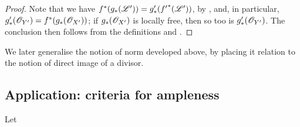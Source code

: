 \begin{proof}
Note that we have $f^*(g_*(\mathscr{L}'))=g'_*({f'}^*(\mathscr{L}'))$, by , and, in particular, $g'_*(\mathscr{O}_{Y'})=f^*(g_*(\mathscr{O}_{X'}))$;
if $g_*(\mathscr{O}_{X'})$ is locally free, then so too is $g'_*(\mathscr{O}_{Y'})$.
The conclusion then follows from the definitions and .
\end{proof}

\begin{remark}[6.5.9]
\label{II.6.5.9}
We later generalise the notion of norm developed above, by placing it relation to the notion of direct image of a divisor.
\end{remark}


\subsection{Application: criteria for ampleness}
\label{subsection:II.6.6}

\begin{proposition}[6.6.1]
\label{II.6.6.1}
Let
\end{proposition}


